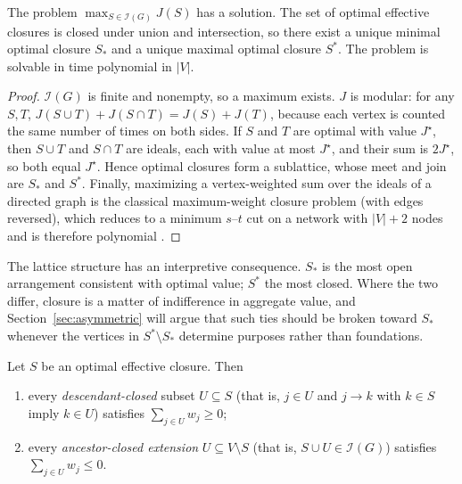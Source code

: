 \begin{proposition}\label{prop:ideal}
The problem $\max_{S\in\mathcal{I}(G)}J(S)$ has a solution. The set of optimal effective closures is closed under union and intersection, so there exist a unique minimal optimal closure $S_\ast$ and a unique maximal optimal closure $S^\ast$. The problem is solvable in time polynomial in $|V|$.
\end{proposition}

\begin{proof}
$\mathcal{I}(G)$ is finite and nonempty, so a maximum exists. $J$ is modular: for any $S,T$, $J(S\cup T)+J(S\cap T)=J(S)+J(T)$, because each vertex is counted the same number of times on both sides. If $S$ and $T$ are optimal with value $J^\star$, then $S\cup T$ and $S\cap T$ are ideals, each with value at most $J^\star$, and their sum is $2J^\star$, so both equal $J^\star$. Hence optimal closures form a sublattice, whose meet and join are $S_\ast$ and $S^\ast$. Finally, maximizing a vertex-weighted sum over the ideals of a directed graph is the classical maximum-weight closure problem (with edges reversed), which reduces to a minimum $s$--$t$ cut on a network with $|V|+2$ nodes and is therefore polynomial \cite{picard1976}.
\end{proof}

The lattice structure has an interpretive consequence. $S_\ast$ is the most open arrangement consistent with optimal value; $S^\ast$ the most closed. Where the two differ, closure is a matter of indifference in aggregate value, and Section~\ref{sec:asymmetric} will argue that such ties should be broken toward $S_\ast$ whenever the vertices in $S^\ast\setminus S_\ast$ determine purposes rather than foundations.

\begin{proposition}\label{prop:local}
Let $S$ be an optimal effective closure. Then
\begin{enumerate}\renewcommand{\labelenumi}{(\roman{enumi})}
\item every \emph{descendant-closed} subset $U\subseteq S$ (that is, $j\in U$ and $j\to k$ with $k\in S$ imply $k\in U$) satisfies $\sum_{j\in U}w_j\geq 0$;
\item every \emph{ancestor-closed extension} $U\subseteq V\setminus S$ (that is, $S\cup U\in\mathcal{I}(G)$) satisfies $\sum_{j\in U}w_j\leq 0$.
\end{enumerate}
\end{proposition}


